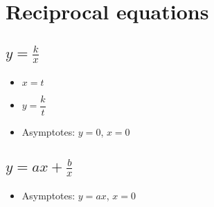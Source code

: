 \section{Reciprocal equations}
\subsection{$y=\frac{k}{x}$}
\begin{itemize}
    \item $x=t$
    \item $y=\dfrac{k}{t}$
    \item Asymptotes: $y=0$, $x=0$
\end{itemize}

\subsection{$y=ax+\frac{b}{x}$}
\begin{itemize}
    \item Asymptotes: $y=ax$, $x=0$
\end{itemize}